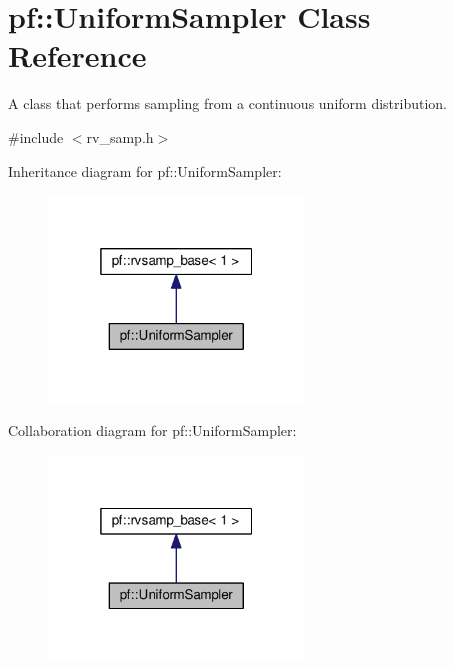 \hypertarget{classpf_1_1UniformSampler}{}\section{pf\+:\+:Uniform\+Sampler Class Reference}
\label{classpf_1_1UniformSampler}


A class that performs sampling from a continuous uniform distribution.  




{\ttfamily \#include $<$rv\+\_\+samp.\+h$>$}



Inheritance diagram for pf\+:\+:Uniform\+Sampler\+:\nopagebreak
\begin{figure}[H]
\begin{center}
\leavevmode
\includegraphics[width=193pt]{classpf_1_1UniformSampler__inherit__graph}
\end{center}
\end{figure}


Collaboration diagram for pf\+:\+:Uniform\+Sampler\+:\nopagebreak
\begin{figure}[H]
\begin{center}
\leavevmode
\includegraphics[width=193pt]{classpf_1_1UniformSampler__coll__graph}
\end{center}
\end{figure}
